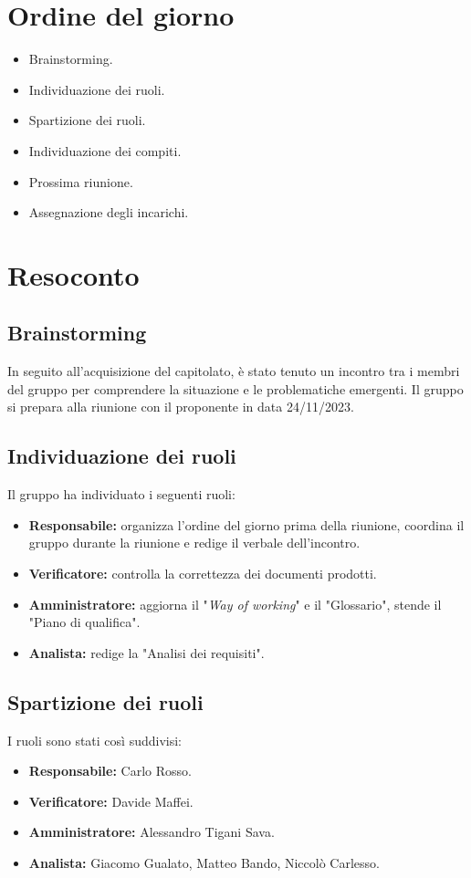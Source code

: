 \section{Ordine del giorno}
\begin{itemize}
	\item Brainstorming.
	\item Individuazione dei ruoli.
	\item Spartizione dei ruoli.
	\item Individuazione dei compiti.
	\item Prossima riunione.
	\item Assegnazione degli incarichi.
\end{itemize}

\section{Resoconto}

\subsection{Brainstorming}
In seguito all'acquisizione del capitolato, è stato tenuto un incontro tra i
membri del gruppo per comprendere la situazione e le problematiche emergenti.
Il gruppo si prepara alla riunione con il proponente in data 24/11/2023.

\subsection{Individuazione dei ruoli}
Il gruppo ha individuato i seguenti ruoli:
\begin{itemize}
	\item \textbf{Responsabile:} organizza l'ordine del giorno prima della
	      riunione, coordina il gruppo durante la riunione e redige il verbale
	      dell'incontro.
	\item \textbf{Verificatore:} controlla la correttezza dei documenti prodotti.
	\item \textbf{Amministratore:} aggiorna il "\textit{Way of working}" e il
	      "Glossario", stende il "Piano di qualifica".
	\item \textbf{Analista:} redige la "Analisi dei requisiti".
\end{itemize}

\subsection{Spartizione dei ruoli}
I ruoli sono stati così suddivisi:
\begin{itemize}
	\item \textbf{Responsabile:} Carlo Rosso.
	\item \textbf{Verificatore:} Davide Maffei.
	\item \textbf{Amministratore:} Alessandro Tigani Sava.
	\item \textbf{Analista:} Giacomo Gualato, Matteo Bando, Niccolò Carlesso.
\end{itemize}

